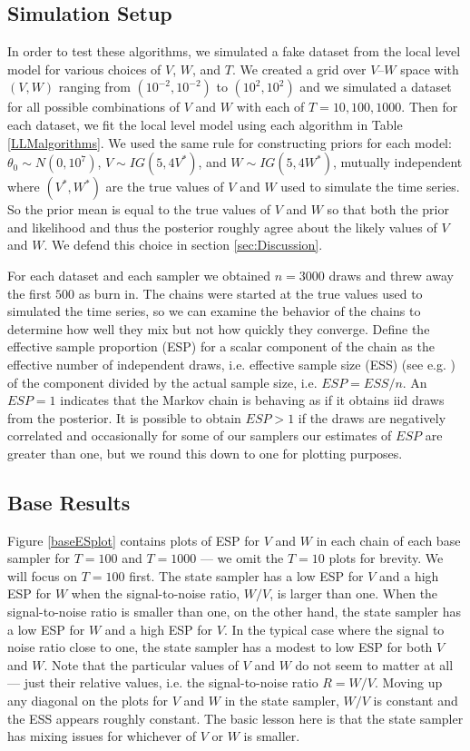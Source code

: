 \documentclass{article}
\begin{document}
\subsection{Simulation Setup}

In order to test these algorithms, we simulated a fake dataset from the local level model for various choices of $V$, $W$, and $T$. We created a grid over $V$--$W$ space with $(V,W)$ ranging from $(10^{-2},10^{-2})$ to $(10^2, 10^2)$ and we simulated a dataset for all possible combinations of $V$ and $W$ with each of $T=10, 100, 1000$. Then for each dataset, we fit the local level model using each algorithm in Table \ref{LLMalgorithms}. We used the same rule for constructing priors for each model: $\theta_0\sim N(0,10^7)$, $V\sim IG(5, 4V^*)$, and $W\sim IG(5, 4W^*)$, mutually independent where $(V^*,W^*)$ are the true values of $V$ and $W$ used to simulate the time series. So the prior mean is equal to the true values of $V$ and $W$ so that both the prior and likelihood and thus the posterior roughly agree about the likely values of $V$ and $W$. We defend this choice in section \ref{sec:Discussion}.

For each dataset and each sampler we obtained $n=3000$ draws and threw away the first $500$ as burn in. The chains were started at the true values used to simulated the time series, so we can examine the behavior of the chains to determine how well they mix but not how quickly they converge. Define the effective sample proportion (ESP) for a scalar component of the chain as the effective number of independent draws, i.e. effective sample size (ESS) (see e.g. \citet{gelman2003bayesian}) of the component divided by the actual sample size, i.e. $ESP=ESS/n$. An $ESP=1$ indicates that the Markov chain is behaving as if it obtains iid draws from the posterior. It is possible to obtain $ESP>1$ if the draws are negatively correlated and occasionally for some of our samplers our estimates of $ESP$ are greater than one, but we round this down to one for plotting purposes.

\subsection{Base Results}
Figure \ref{baseESplot} contains plots of ESP for $V$ and $W$ in each chain of each base sampler for $T=100$ and $T=1000$ --- we omit the $T=10$ plots for brevity. We will focus on $T=100$ first. The state sampler has a low ESP for $V$ and a high ESP for $W$ when the signal-to-noise ratio, $W/V$, is larger than one. When the signal-to-noise ratio is smaller than one, on the other hand, the state sampler has a low ESP for $W$ and a high ESP for $V$. In the typical case where the signal to noise ratio close to one, the state sampler has a modest to low ESP for both $V$ and $W$. Note that the particular values of $V$ and $W$ do not seem to matter at all --- just their relative values, i.e. the signal-to-noise ratio $R=W/V$. Moving up any diagonal on the plots for $V$ and $W$ in the state sampler, $W/V$ is constant and the ESS appears roughly constant. The basic lesson here is that the state sampler has mixing issues for whichever of $V$ or $W$ is smaller. 
\end{document}
